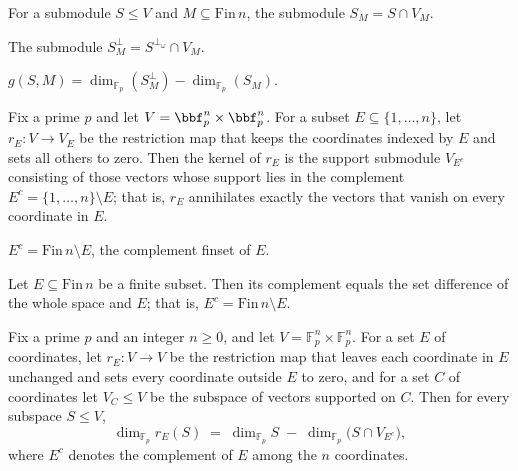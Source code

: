 \begin{definition}[Intersection $S_M = S \cap V_M$]
\label{S_M}
\leanok
{}
For a submodule $S \le V$ and $M \subseteq \mathrm{Fin}\,n$, the submodule $S_M = S \cap V_M$.
\end{definition}

\begin{definition}[Intersection $S^{\perp}_M = S^{\perp_\omega} \cap V_M$]
\label{S_perp_M}
\leanok
{}
The submodule $S^{\perp}_M = S^{\perp_\omega} \cap V_M$.
\end{definition}

\begin{definition}
\label{g}
\leanok
{}
$g(S,M) = \dim_{\mathbb{F}_p}(S^{\perp}_M) - \dim_{\mathbb{F}_p}(S_M)$.
\end{definition}

\begin{lemma}
\label{ker_r_E}
\leanok
{}
Fix a prime $p$ and let $V = \bbf_p^n \times \bbf_p^n$. For a subset $E \subseteq
\{1,\dots,n\}$, let $r_E \colon V \to V_E$ be the restriction map that keeps the
coordinates indexed by $E$ and sets all others to zero. Then the kernel of $r_E$ is the
support submodule $V_{E^c}$ consisting of those vectors whose support lies in the
complement $E^c = \{1,\dots,n\} \setminus E$; that is, $r_E$ annihilates exactly the
vectors that vanish on every coordinate in $E$.
\end{lemma}

\begin{definition}[Complement of $E$]
\label{E_c}
\leanok
$E^c = \mathrm{Fin}\,n \setminus E$, the complement finset of $E$.
\end{definition}

\begin{lemma}
\label{E_c_eq}
\leanok
{}
Let $E \subseteq \mathrm{Fin}\,n$ be a finite subset. Then its complement equals the set
difference of the whole space and $E$; that is, $E^c = \mathrm{Fin}\,n \setminus E$.
\end{lemma}

\begin{lemma}
\label{dim_map_r_E}
\leanok
{}
Fix a prime $p$ and an integer $n \ge 0$, and let $V = \mathbb{F}_p^n \times
\mathbb{F}_p^n$. For a set $E$ of coordinates, let $r_E \colon V \to V$ be the
restriction map that leaves each coordinate in $E$ unchanged and sets every coordinate
outside $E$ to zero, and for a set $C$ of coordinates let $V_C \le V$ be the subspace of
vectors supported on $C$. Then for every subspace $S \le V$,
\[
\dim_{\mathbb{F}_p} r_E(S) \;=\; \dim_{\mathbb{F}_p} S \;-\;
\dim_{\mathbb{F}_p}\!\bigl(S \cap V_{E^c}\bigr),
\]
where $E^c$ denotes the complement of $E$ among the $n$ coordinates.
\end{lemma}

